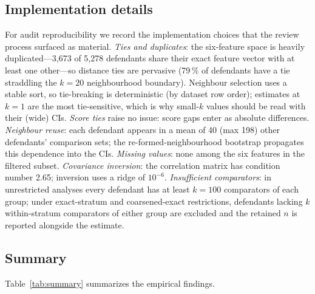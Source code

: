 \documentclass[11pt]{article}
\begin{document}
\subsection{Implementation details}
\label{sec:implementation}

For audit reproducibility we record the implementation choices that
the review process surfaced as material. \emph{Ties and duplicates}:
the six-feature space is heavily duplicated---3{,}673 of 5{,}278
defendants share their exact feature vector with at least one
other---so distance ties are pervasive (79\,\% of defendants have a
tie straddling the $k = 20$ neighbourhood boundary). Neighbour
selection uses a stable sort, so tie-breaking is deterministic (by
dataset row order); estimates at $k = 1$ are the most tie-sensitive,
which is why small-$k$ values should be read with their (wide) CIs.
\emph{Score ties} raise no issue: score gaps enter as absolute
differences. \emph{Neighbour reuse}: each defendant appears in a mean
of 40 (max 198) other defendants' comparison sets; the
re-formed-neighbourhood bootstrap propagates this dependence into the
CIs. \emph{Missing values}: none among the six features in the
filtered subset. \emph{Covariance inversion}: the correlation matrix
has condition number 2.65; inversion uses a ridge of $10^{-6}$.
\emph{Insufficient comparators}: in unrestricted analyses every
defendant has at least $k = 100$ comparators of each group; under
exact-stratum and coarsened-exact restrictions, defendants lacking
$k$ within-stratum comparators of either group are excluded and the
retained $n$ is reported alongside the estimate.

\subsection{Summary}

Table~\ref{tab:summary} summarizes the empirical findings.
\end{document}
